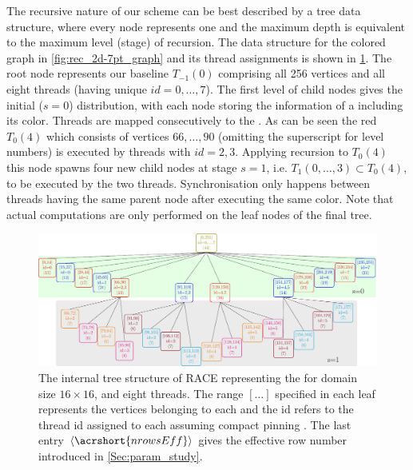 The recursive nature of our scheme can be best  described by a tree data structure, where every node represents one \levelGroup and  the maximum depth is equivalent to the maximum level (stage) of recursion. The data structure for the colored graph in \cref{fig:rec_2d-7pt_graph} and its thread assignments is shown in \cref{fig:rec_2d-7pt_tree}. The root node represents our baseline \levelGroup $T_{-1}(0)$ comprising all 256 vertices and all eight threads (having unique $id=0,\ldots,7$). The first level of child nodes gives the initial ($s=0$) distribution, with each node storing the information of a \levelGroup including its color. Threads are mapped consecutively to the \levelGroups. As can be seen the red $T_0(4)$ \levelGroup which consists of vertices $66,\ldots,90$ (omitting the superscript for level numbers) is executed by threads with $id=2,3$.  Applying recursion to $T_0(4)$ this node spawns four new child nodes at stage $s =1$, i.e. \levelGroups $T_1(0,\ldots,3) \subset T_0(4)$, to be executed by the two threads. Synchronisation only happens between threads having the same parent node after executing the same color. Note that actual computations are only performed on the leaf nodes of the final tree.
	 \begin{figure}[thbp]
		 \includegraphics[width=\textwidth, height=0.2\textheight]{pics/recursion/2d-7pt_example/tree/tree}
	 	\caption{The internal tree structure of \acrshort{RACE} representing the \stex for domain size $16 \times 16$, and eight threads. The range $[\ldots]$ specified in each leaf represents the vertices belonging to each \levelGroup and the id refers to the thread id assigned to each \levelGroup assuming compact pinning . The last entry $\langle\acrshort{nrowsEff}\rangle$ gives the effective row number introduced in  \cref{Sec:param_study}. }
	 	\label{fig:rec_2d-7pt_tree}
	 \end{figure}

